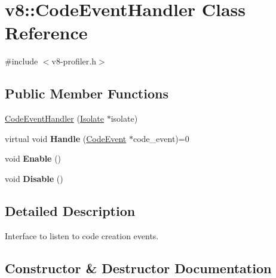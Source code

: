 \hypertarget{classv8_1_1CodeEventHandler}{}\section{v8\+:\+:Code\+Event\+Handler Class Reference}
\label{classv8_1_1CodeEventHandler}


{\ttfamily \#include $<$v8-\/profiler.\+h$>$}

\subsection*{Public Member Functions}
\begin{DoxyCompactItemize}
\item 
\mbox{\hyperlink{classv8_1_1CodeEventHandler_a3d88d7de87c3b51d964ab5c8cc06dc03}{Code\+Event\+Handler}} (\mbox{\hyperlink{classv8_1_1Isolate}{Isolate}} $\ast$isolate)
\item 
\mbox{\label{classv8_1_1CodeEventHandler_a61d0870a92c4b814ea5dbe29acf463c6}} 
virtual void {\bfseries Handle} (\mbox{\hyperlink{classv8_1_1CodeEvent}{Code\+Event}} $\ast$code\+\_\+event)=0
\item 
\mbox{\label{classv8_1_1CodeEventHandler_a3691182a45ff92e7d421c3a17bda305f}} 
void {\bfseries Enable} ()
\item 
\mbox{\label{classv8_1_1CodeEventHandler_a9024641a77703a601dcdf840b888ff05}} 
void {\bfseries Disable} ()
\end{DoxyCompactItemize}


\subsection{Detailed Description}
Interface to listen to code creation events. 

\subsection{Constructor \& Destructor Documentation}
\mbox{\label{classv8_1_1CodeEventHandler_a3d88d7de87c3b51d964ab5c8cc06dc03}} 
